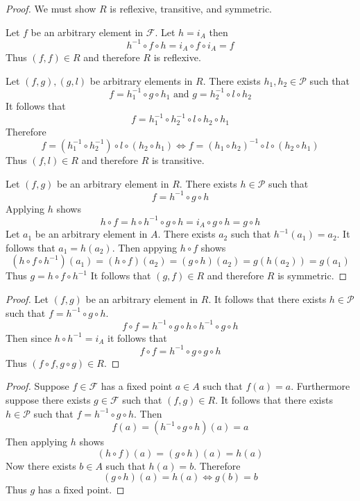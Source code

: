 \begin{proof}
    We must show $R$ is reflexive, transitive, 
        and symmetric.

    Let $f$ be an arbitrary element in $\mathcal{F}$.
    Let $h = i_A$ then 
    \[h^{-1} \circ f \circ h = i_A \circ f \circ i_A = f\]
    Thus $(f, f) \in R$ and therefore $R$ is reflexive.

    Let $(f, g), (g, l)$ be arbitrary elements in $R$.
    There exists $h_1, h_2 \in \mathcal{P}$ such that 
    \[f = h_1^{-1} \circ g \circ h_1 \text{ and } g = h_2^{-1} \circ l \circ h_2\]
    It follows that 
    \[f = h_1^{-1} \circ h_2^{-1} \circ l \circ h_2 \circ h_1\]
    Therefore 
    \[f = (h_1^{-1} \circ h_2^{-1}) \circ l \circ (h_2 \circ h_1) \iff f = (h_1 \circ h_2)^{-1} \circ l \circ  (h_2 \circ h_1)\]
    Thus $(f, l) \in R$ and therefore $R$ is transitive.

    Let $(f, g)$ be an arbitrary element in $R$.
    There exists $h \in \mathcal{P}$ such that 
    \[f = h^{-1} \circ g \circ h\]
    Applying $h$ shows 
    \[h \circ f = h \circ h^{-1} \circ g \circ h = i_A \circ g \circ h = g \circ h\]
    Let $a_1$ be an arbitrary element in $A$.
    There exists $a_2$ such that $h^{-1}(a_1) = a_2$.
    It follows that $a_1 = h(a_2)$.
    Then appying $h \circ f$ shows
    \[(h \circ f \circ h^{-1})(a_1) = (h \circ f)(a_2) = (g \circ h)(a_2) = g(h(a_2)) = g(a_1)\]
    Thus $g = h \circ f \circ h^{-1}$
    It follows that $(g, f) \in R$ and therefore $R$ is symmetric.
\end{proof}

\begin{proof}
    Let $(f, g)$ be an arbitrary element in $R$.
    It follows that there exists $h \in \mathcal{P}$
        such that $f = h^{-1} \circ g \circ h$.
    \[f \circ f = h^{-1} \circ g \circ h \circ h^{-1} \circ g \circ h\]
    Then since $h \circ h^{-1} = i_A$ it follows that 
    \[f \circ f = h^{-1} \circ g  \circ g \circ h\]
    Thus $(f \circ f, g \circ g) \in R$.
\end{proof}

\begin{proof}
    Suppose $f \in \mathcal{F}$ has a fixed point $a \in A$
        such that $f(a) = a$.
    Furthermore suppose there exists $g \in \mathcal{F}$
        such that $(f, g) \in R$.
    It follows that there exists $h \in \mathcal{P}$ 
        such that $f = h^{-1} \circ g \circ h$.
    Then 
    \[f(a) = (h^{-1} \circ g \circ h)(a) =  a\]
    Then applying $h$ shows
    \[(h \circ f)(a) = (g \circ h)(a) =  h(a)\]
    Now there exists $b \in A$ such that $h(a) = b$.
    Therefore
    \[(g \circ h)(a) =  h(a) \iff g(b) = b\]
    Thus $g$ has a fixed point.
\end{proof}

